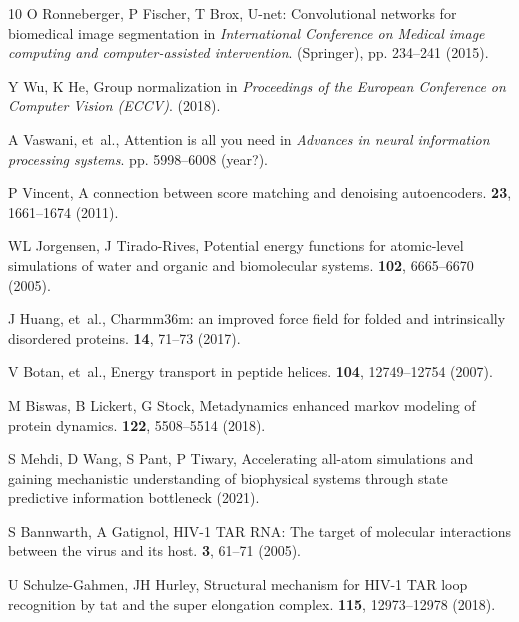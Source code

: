 \documentclass[9pt,twocolumn,twoside]{pnas-new}
\begin{document}
\begin{thebibliography}{10}
O Ronneberger, P Fischer, T Brox, U-net: Convolutional networks for biomedical
  image segmentation in {\em International Conference on Medical image
  computing and computer-assisted intervention}.
\newblock (Springer), pp. 234--241 (2015).

Y Wu, K He, Group normalization in {\em Proceedings of the European Conference
  on Computer Vision (ECCV)}.
\newblock (2018).

A Vaswani, et~al., Attention is all you need in {\em Advances in neural
  information processing systems}.
\newblock pp. 5998--6008 (year?).

P Vincent, A connection between score matching and denoising autoencoders.
 \textbf{23},
  1661--1674 (2011).

WL Jorgensen, J Tirado-Rives, Potential energy functions for atomic-level
  simulations of water and organic and biomolecular systems.
 \textbf{102}, 6665--6670 (2005).

J Huang, et~al., Charmm36m: an improved force field for folded and
  intrinsically disordered proteins.
 \textbf{14}, 71--73
  (2017).

V Botan, et~al., Energy transport in peptide helices.
 \textbf{104}, 12749--12754 (2007).

M Biswas, B Lickert, G Stock, Metadynamics enhanced markov modeling of protein
  dynamics.
  \textbf{122}, 5508--5514 (2018).

S Mehdi, D Wang, S Pant, P Tiwary, Accelerating all-atom simulations and
  gaining mechanistic understanding of biophysical systems through state
  predictive information bottleneck (2021).

S Bannwarth, A Gatignol, {HIV}-1 {TAR} {RNA}: The target of molecular
  interactions between the virus and its host.
 \textbf{3}, 61--71
  (2005).

U Schulze-Gahmen, JH Hurley, Structural mechanism for {HIV}-1 {TAR} loop
  recognition by tat and the super elongation complex.
 \textbf{115}, 12973--12978 (2018).


\end{thebibliography}
\end{document}
